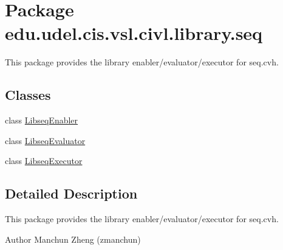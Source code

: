 \hypertarget{namespaceedu_1_1udel_1_1cis_1_1vsl_1_1civl_1_1library_1_1seq}{}\section{Package edu.\+udel.\+cis.\+vsl.\+civl.\+library.\+seq}
\label{namespaceedu_1_1udel_1_1cis_1_1vsl_1_1civl_1_1library_1_1seq}


This package provides the library enabler/evaluator/executor for seq.\+cvh.  


\subsection*{Classes}
\begin{DoxyCompactItemize}
\item 
class \hyperlink{classedu_1_1udel_1_1cis_1_1vsl_1_1civl_1_1library_1_1seq_1_1LibseqEnabler}{Libseq\+Enabler}
\item 
class \hyperlink{classedu_1_1udel_1_1cis_1_1vsl_1_1civl_1_1library_1_1seq_1_1LibseqEvaluator}{Libseq\+Evaluator}
\item 
class \hyperlink{classedu_1_1udel_1_1cis_1_1vsl_1_1civl_1_1library_1_1seq_1_1LibseqExecutor}{Libseq\+Executor}
\end{DoxyCompactItemize}


\subsection{Detailed Description}
This package provides the library enabler/evaluator/executor for seq.\+cvh. 

\begin{DoxyAuthor}{Author}
Manchun Zheng (zmanchun) 
\end{DoxyAuthor}
